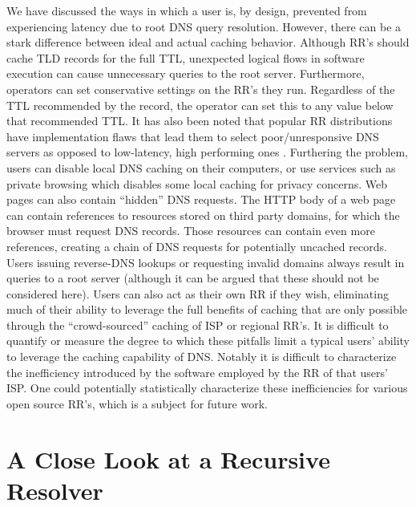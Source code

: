\documentclass[sigconf,nonacm,10pt]{acmart}
\begin{document}
We have discussed the ways in which a user is, by design, prevented from
experiencing latency due to root DNS query resolution. However, there
can be a stark difference between ideal and actual caching behavior.
Although RR's should cache TLD records for the full TTL, unexpected
logical flows in software execution can cause unnecessary queries to the
root server. Furthermore, operators can set conservative settings on the
RR's they run. Regardless of the TTL recommended by the record, the
operator can set this to any value below that recommended TTL. It has
also been noted that popular RR distributions have implementation flaws
that lead them to select poor/unresponsive DNS servers as opposed to
low-latency, high performing ones \cite{yu2012authority}. \break
Furthering the problem, users can disable local DNS caching on their
computers, or use services such as private browsing which disables some
local caching for privacy concerns. Web pages can also contain
``hidden'' DNS requests. The HTTP body of a web page can contain
references to resources stored on third party domains, for which the
browser must request DNS records. Those resources can contain even more
references, creating a chain of DNS requests for potentially uncached
records. Users issuing reverse-DNS lookups or requesting invalid domains
always result in queries to a root server (although it can be argued
that these should not be considered here). Users can also act as their
own RR if they wish, eliminating much of their ability to leverage the
full benefits of caching that are only possible through the
``crowd-sourced'' caching of ISP or regional RR's. \break
It is difficult to quantify or measure the degree to which these
pitfalls limit a typical users' ability to leverage the caching
capability of DNS. Notably it is difficult to characterize the
inefficiency introduced by the software employed by the RR of that
users' ISP. One could potentially statistically characterize these
inefficiencies for various open source RR's, which is a subject for
future work.

\section{A Close Look at a Recursive
Resolver}\label{a-close-look-at-a-recursive-resolver-1}
\end{document}
